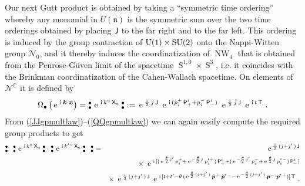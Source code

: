 \documentclass[11pt,a4paper]{article}
\DeclareMathOperator{\Sphere}{S}
\DeclareMathOperator{\NW}{NW}
\let\S\Sphere
\newcommand{\NOb}{\mbox{$\substack{\bullet\\\bullet}$}} %
\newcommand{\mbf}[1]{{\boldsymbol {#1} }}
\def\ii{{\,{\rm i}\,}}
\def\P{{\sf P}}
\def\T{{\sf T}}
\def\X{{\sf X}}
\def\J{{\sf J}}
\def\mx{{\mbf x}}
\def\mk{{\mbf k}}
\def\mbp{{\mbf p}}
\def\mfn{{\mathfrak n}}
\newcommand{\complex}{{\mathbb C}} %
\def\e{{\,\rm e}\,}
\def\bea{\begin{eqnarray}}
\def\eea{\end{eqnarray}}
\newcommand{\beq}{\begin{eqnarray}}
\newcommand{\eeq}{\end{eqnarray}}
\begin{document}
Our next Gutt product is obtained by taking a ``symmetric time
ordering'' whereby any monomial in $U(\mfn)$ is the symmetric sum
over the two time orderings obtained by placing $\J$ to the far right
and to the far left. This ordering is induced by the group contraction of
${\rm U}(1)\times{\rm SU}(2)$ onto the Nappi-Witten group
$\mathcal{N}_0$, and it thereby induces the coordinatization of
$\NW_4$ that is obtained from the
Penrose-G\"uven limit of the spacetime $\S^{1,0}\times\S^3$, i.e. it
coincides with the Brinkman coordinatization of the Cahen-Wallach
spacetime. On elements of $\mathcal{N}^\complex$ it is defined by
\beq
\Omega_\bullet\left(\e^{\ii\mk\cdot\mx}\right)=
\NOb\,\e^{\ii k^a\,\X_a}\,\NOb:=\e^{\frac\ii2\,j\,\J}~
\e^{\ii(p_i^+\,\P^i_+
+p_i^-\,\P^i_-)}~\e^{\frac\ii2\,j\,\J}~\e^{\ii t\,\T} \ .
\label{TOsymgpprods}\eeq
From (\ref{JJgpmultlaw})--(\ref{QQgpmultlaw}) we can again easily
compute the required group products to get
\bea
\NOb~~\NOb\,\e^{\ii k^a\,\X_a}\,\NOb\cdot\NOb\,\e^{\ii k^{\prime\,a}\,\X_a}
\,\NOb~~\NOb&=&\e^{\frac\ii2\,(j+j'\,)\,\J}\nonumber\\ &&\times~
\e^{\ii[(\e^{\frac{\theta}2\,j'}\,p_i^++
\e^{-\frac{\theta}2\,j}\,p_i^{\prime\,+})\,
\P^i_++(\e^{-\frac{\theta}2\,j'}\,p_i^-+
\e^{\frac{\theta}2\,j}\,p_i^{\prime\,-})\,\P^i_-]}
\nonumber\\ &&\times~\e^{\frac\ii2\,(j+j'\,)\,\J}~
\e^{\ii[t+t'-\theta\,(\e^{\frac{\theta}2\,(j+j'\,)}\,
\mbp^+\cdot\mbp^{\prime\,-}-\e^{-\frac{\theta}2\,(j+j'\,)}\,
\mbp^-\cdot\mbp^{\prime\,+})]\,\T} \ . \nonumber\\ &&
\label{TOsymgpprodexpl}\eea
\end{document}
